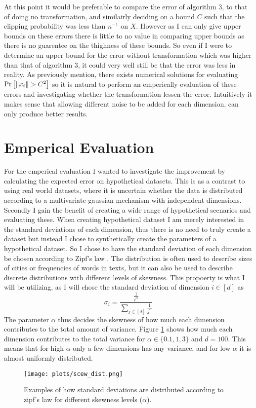 \documentclass[a4paper,12pt]{article}
\begin{document}
At this point it would be preferable to compare the error of algorithm 3, to that of doing no transformation, and similairly deciding on a bound $C$ 
such that the clipping probability was less than $n^{-1}$ on $X$. However as I can only give upper bounds on these errors there is little to no value in comparing 
upper bounds as there is no guarentee on the thighness of these bounds. So even if I were to determine an upper bound for the error without transformation which was higher than that of algorithm 3, 
it could very well still be that the error was less in reality.
As previously mention, there exists numerical solutions for evaluating $\Pr\left [\|x_i\| > C^2 \right]$ so it is natural to perform an emperically evaluation of these errors
 and investigating whether the transformation lessen the error.
Intuitively it makes sense that allowing different noise to be added for each dimension, can only produce better results.



\section{Emperical Evaluation}
\label{sec:emperical}
For the emperical evaluation I wanted to investigate the 
improvement by calculating the expected error on hypothetical datasets. 
This is as a contrast to using real world datasets, where it is uncertain whether
the data is distributed according to a multivariate gaussian mechanism with independent dimensions.
Secondly I gain the benefit of creating a wide range of hypothetical scenarios and evaluating these.
When creating hypothetical dataset I am merely interested in the standard deviations of each dimension,
thus there is no need to truly create a dataset but instead I chose to 
synthetically create the parameters of a hypothetical dataset.
So I chose to have the standard deviation of each dimension be chosen according 
to Zipf's law \cite{zipf}. The distribution is often used to describe 
sizes of cities or frequencies of words in texts, but it can also be used to 
describe discrete distributions with different levels of skewness. 
This propoerty is what I will be utilizing, as I will chose the 
standard deviation of dimension $i \in [d]$ as
\[
    \sigma_i = \frac{ \frac{1}{i^\alpha}}{\sum_{j \in [d]} \frac{1}{j^\alpha}}
\]
The parameter $\alpha$ thus decides the skewness of how much each dimension contributes to the total amount of variance.
Figure \ref{fig:skew} shows how much each dimension contributes to the total variance for
$\alpha \in \{0.1,1,3\}$ and $d = 100$. This means that for high $\alpha$ only a few dimensions has any variance, 
and for low $\alpha$ it is almost uniformly distributed.
\begin{figure}[h!]
\label{fig:skew}
\texttt{[image: plots/scew\_dist.png]}
\caption{Examples of how standard deviations are distributed according to 
zipf's law for different skewness levels ($\alpha$).} 
\end{figure}
\end{document}

